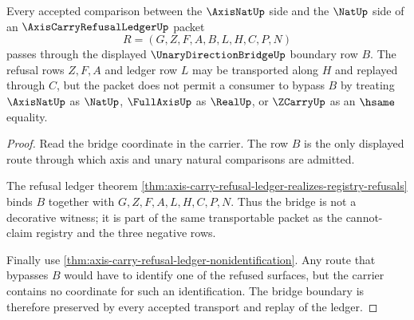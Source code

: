 \begin{theorem}
\label{thm:axis-carry-refusal-ledger-bridge-boundary-preservation}
Every accepted comparison between the $\AxisNatUp$ side and the $\NatUp$ side of an $\AxisCarryRefusalLedgerUp$ packet
$$
R=(G,Z,F,A,B,L,H,C,P,N)
$$
passes through the displayed $\UnaryDirectionBridgeUp$ boundary row $B$. The refusal rows $Z,F,A$ and ledger row $L$ may be transported along $H$ and replayed through $C$, but the packet does not permit a consumer to bypass $B$ by treating $\AxisNatUp$ as $\NatUp$, $\FullAxisUp$ as $\RealUp$, or $\ZCarryUp$ as an $\hsame$ equality.
\end{theorem}
\begin{proof}
Read the bridge coordinate in the carrier. The row $B$ is the only displayed route through which axis and unary natural comparisons are admitted.

The refusal ledger theorem \autoref{thm:axis-carry-refusal-ledger-realizes-registry-refusals} binds $B$ together with $G,Z,F,A,L,H,C,P,N$. Thus the bridge is not a decorative witness; it is part of the same transportable packet as the cannot-claim registry and the three negative rows.

Finally use \autoref{thm:axis-carry-refusal-ledger-nonidentification}. Any route that bypasses $B$ would have to identify one of the refused surfaces, but the carrier contains no coordinate for such an identification. The bridge boundary is therefore preserved by every accepted transport and replay of the ledger.
\end{proof}

